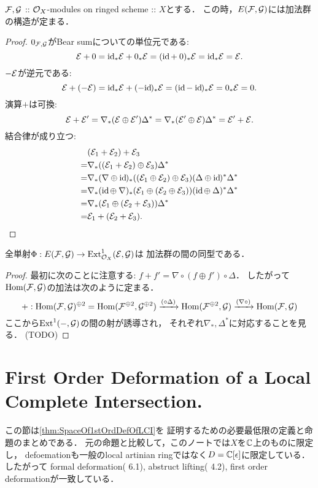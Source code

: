 \documentclass[a4paper]{jsarticle}
\newcommand{\diag}{\Delta}
\newcommand{\codiag}{\nabla}
\begin{document}
    \begin{Lemma}
        $\shF, \shG$ :: $\shO_X$-modules on ringed scheme :: $X$とする．
        この時，$E(\shF, \shG)$には加法群の構造が定まる．
    \end{Lemma}
    \begin{proof}
        $0_{\shF, \shG}$がBear sumについての単位元である:
        \[ \shE+0=\id[*]\shE+0_*\shE=(\id+0)_*\shE=\id[*]\shE=\shE. \]
        $-\shE$が逆元である:
        \[ \shE+(-\shE)=\id[*]\shE+(-\id)_*\shE=(\id-\id)_*\shE=0_*\shE=0. \]
        演算$+$は可換:
        \[ \shE+\shE'=\codiag_*(\shE \oplus \shE')\diag^*=\codiag_*(\shE' \oplus \shE)\diag^*=\shE'+\shE. \]
        結合律が成り立つ:
        \begin{align*}
            {}& (\shE_1+\shE_2)+\shE_3 \\
            =&  \codiag_*((\shE_1+\shE_2) \oplus \shE_3) \diag^* \\
            =&  \codiag_*(\codiag \oplus \id)_*((\shE_1 \oplus \shE_2) \oplus \shE_3)(\diag \oplus \id)^* \diag^* \\
            =&  \codiag_*(\id \oplus \codiag)_*(\shE_1 \oplus (\shE_2 \oplus \shE_3))(\id \oplus \diag )^* \diag^* \\
            =&  \codiag_*(\shE_1 \oplus (\shE_2+\shE_3))\diag^* \\
            =&  \shE_1+(\shE_2+\shE_3).
        \end{align*}
    \end{proof}

    \begin{Lemma}\label{lemma:PhiIsIso}
        全単射$\Phi: E(\shF, \shG) \to \Ext^1_{\shO_X}(\shE, \shG)$は
        加法群の間の同型である．
    \end{Lemma}
    \begin{proof}
        最初に次のことに注意する: 
        $f+f'=\codiag \circ (f \oplus f') \circ \diag$．
        したがって$\Hom(\shF, \shG)$の加法は次のように定まる．
        \[
            +: \Hom(\shF, \shG)^{\oplus 2}=\Hom(\shF^{\oplus 2}, \shG^{\oplus 2}) \xrightarrow{(\circ \diag)}
            \Hom(\shF^{\oplus 2}, \shG) \xrightarrow{(\codiag \circ)}
            \Hom(\shF, \shG)
        \]
        ここから$\Ext^1(-, \shG)$の間の射が誘導され，
        それぞれ$\codiag_*, \diag^*$に対応することを見る．
        (TODO)
    \end{proof}

\section{First Order Deformation of a Local Complete Intersection.}
    この節は\ref{thm:SpaceOf1stOrdDefOfLCI}を
    証明するための必要最低限の定義と命題のまとめである．
    元の命題と比較して，このノートでは$X$を$\C$上のものに限定し，
    defoemationも一般のlocal artinian ringではなく$D=\C[\epsilon]$に限定している．
    したがって
    formal deformation(\cite{DefLCI} 6.1),
    abstruct lifting(\cite{DefLCI} 4.2), 
    first order deformationが一致している．
\end{document}
